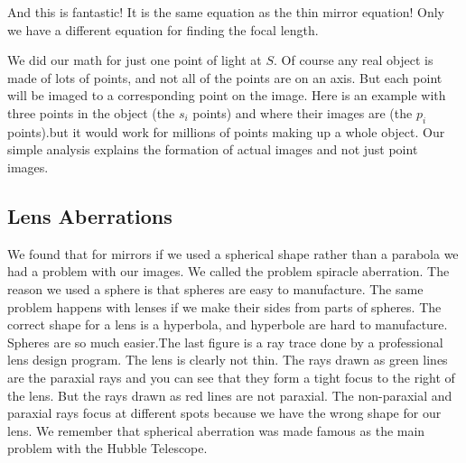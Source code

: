\documentclass{article}
\begin{document}
And this is fantastic! It is the
same equation as the thin mirror equation! Only we have a different equation
for finding the focal length.

We did our math for just one point of light at $S.$ Of course any real
object is made of lots of points, and not all of the points are on an axis.
But each point will be imaged to a corresponding point on the image. Here is
an example with three points in the object (the $s_{i}$ points) and where
their images are (the $p_{i}$ points).but it would work for millions of
points making up a whole object. Our simple analysis explains the formation
of actual images and not just point images.

\subsection{Lens Aberrations}

We found that for mirrors if we used a spherical shape rather than a
parabola we had a problem with our images. We called the problem spiracle
aberration. The reason we used a sphere is that spheres are easy to
manufacture. The same problem happens with lenses if we make their sides
from parts of spheres. The correct shape for a lens is a hyperbola, and
hyperbole are hard to manufacture. Spheres are so much easier.The last figure is a ray trace
done by a professional lens design program. The lens is clearly not thin.
The rays drawn as green lines are the paraxial rays and you can see that
they form a tight focus to the right of the lens. But the rays drawn as red
lines are not paraxial. The non-paraxial and paraxial rays focus at
different spots because we have the wrong shape for our lens. We remember
that spherical aberration was made famous as the main problem with the
Hubble Telescope.
\end{document}
